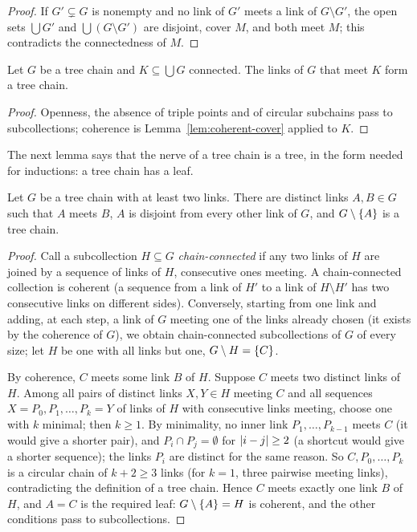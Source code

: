\begin{proof}
If $G'\subsetneq G$ is nonempty and no link of $G'$ meets a link of $G\setminus G'$, the open sets
$\bigcup G'$ and $\bigcup(G\setminus G')$ are disjoint, cover $M$, and both meet $M$; this
contradicts the connectedness of $M$.
\end{proof}


\begin{lemma}\label{lem:filter-meet}
Let $G$ be a tree chain and $K\subseteq\bigcup G$ connected. The links of $G$ that meet $K$ form a tree
chain.
\end{lemma}

\begin{proof}
Openness, the absence of triple points and of circular subchains pass to subcollections; coherence
is Lemma~\ref{lem:coherent-cover} applied to $K$.
\end{proof}


The next lemma says that the nerve of a tree chain is a tree, in the form needed for inductions: a
tree chain has a leaf.

\begin{lemma}[Leaves]\label{lem:leaf}
Let $G$ be a tree chain with at least two links. There are distinct links $A,B\in G$ such that $A$
meets $B$, $A$ is disjoint from every other link of $G$, and $G\setminus\left\{ A \right\}$ is a tree chain.
\end{lemma}

\begin{proof}
Call a subcollection $H\subseteq G$ \emph{chain-connected} if any two links of $H$ are joined by a
sequence of links of $H$, consecutive ones meeting. A chain-connected collection is coherent (a
sequence from a link of $H'$ to a link of $H\setminus H'$ has two consecutive links on different
sides). Conversely, starting from one link and adding, at each step, a link of $G$ meeting one of the
links already chosen (it exists by the coherence of $G$), we obtain chain-connected subcollections of
$G$ of every size; let $H$ be one with all links but one, $G\setminus H=\left\{ C \right\}$.

By coherence, $C$ meets some link $B$ of $H$. Suppose $C$ meets two distinct links of $H$. Among all
pairs of distinct links $X,Y\in H$ meeting $C$ and all sequences $X=P_0,P_1,\dots,P_k=Y$ of links of
$H$ with consecutive links meeting, choose one with $k$ minimal; then $k\ge1$. By minimality, no
inner link $P_1,\dots,P_{k-1}$ meets $C$ (it would give a shorter pair), and $P_i\cap P_j=\emptyset$
for $\left\lvert i-j\right\rvert\ge2$ (a shortcut would give a shorter sequence); the links $P_i$ are distinct for the
same reason. So $C,P_0,\dots,P_k$ is a circular chain of $k+2\ge3$ links (for $k=1$, three pairwise
meeting links), contradicting the definition of a tree chain. Hence $C$ meets exactly one link $B$ of
$H$, and $A=C$ is the required leaf: $G\setminus\left\{ A \right\}=H$ is coherent, and the other conditions pass to
subcollections.
\end{proof}

